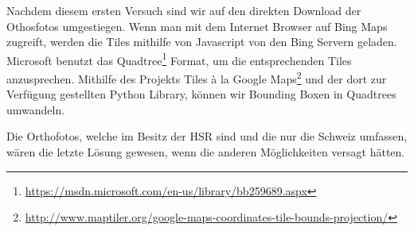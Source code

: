 Nachdem diesem ersten Versuch sind wir auf den direkten Download der Othosfotos umgestiegen. Wenn man mit dem Internet Browser auf Bing Maps zugreift, werden die Tiles mithilfe von Javascript von den Bing Servern geladen. Microsoft benutzt das Quadtree\footnote{\url{https://msdn.microsoft.com/en-us/library/bb259689.aspx}} Format, um die entsprechenden Tiles anzusprechen. Mithilfe des Projekts Tiles à la Google Maps\footnote{\url{http://www.maptiler.org/google-maps-coordinates-tile-bounds-projection/}} und der dort zur Verfügung gestellten Python Library, können wir Bounding Boxen in Quadtrees umwandeln.

Die Orthofotos, welche im Besitz der HSR sind und die nur die Schweiz umfassen, wären die letzte Lösung gewesen, wenn die anderen Möglichkeiten versagt hätten.